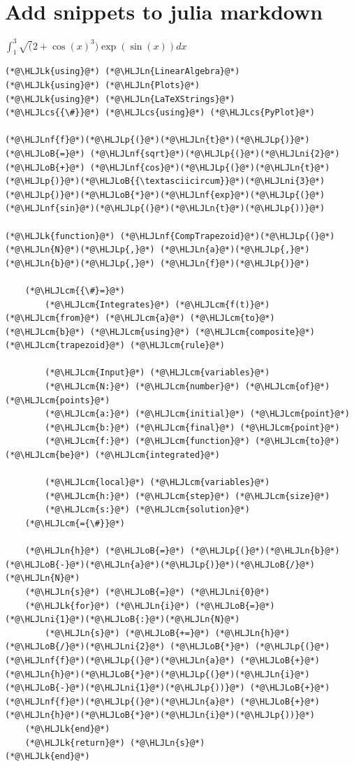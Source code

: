 \documentclass[12pt,a4paper]{article}
\newcommand{\HLJLk}[1]{\textcolor[RGB]{148,91,176}{\textbf{#1}}}
\newcommand{\HLJLn}[1]{#1}
\newcommand{\HLJLnf}[1]{\textcolor[RGB]{66,102,213}{#1}}
\newcommand{\HLJLni}[1]{\textcolor[RGB]{59,151,46}{#1}}
\newcommand{\HLJLoB}[1]{\textcolor[RGB]{102,102,102}{\textbf{#1}}}
\newcommand{\HLJLp}[1]{#1}
\newcommand{\HLJLcm}[1]{\textcolor[RGB]{153,153,119}{\textit{#1}}}
\newcommand{\HLJLcs}[1]{\textcolor[RGB]{153,153,119}{\textit{#1}}}
\begin{document}
\section{Add snippets to julia markdown}
$\int_1^3 \sqrt(2+\cos(x)^3)\exp(\sin(x))dx$


\begin{lstlisting}
(*@\HLJLk{using}@*) (*@\HLJLn{LinearAlgebra}@*)
(*@\HLJLk{using}@*) (*@\HLJLn{Plots}@*)
(*@\HLJLk{using}@*) (*@\HLJLn{LaTeXStrings}@*)
(*@\HLJLcs{{\#}}@*) (*@\HLJLcs{using}@*) (*@\HLJLcs{PyPlot}@*)

(*@\HLJLnf{f}@*)(*@\HLJLp{(}@*)(*@\HLJLn{t}@*)(*@\HLJLp{)}@*) (*@\HLJLoB{=}@*) (*@\HLJLnf{sqrt}@*)(*@\HLJLp{(}@*)(*@\HLJLni{2}@*) (*@\HLJLoB{+}@*) (*@\HLJLnf{cos}@*)(*@\HLJLp{(}@*)(*@\HLJLn{t}@*)(*@\HLJLp{)}@*)(*@\HLJLoB{{\textasciicircum}}@*)(*@\HLJLni{3}@*)(*@\HLJLp{)}@*)(*@\HLJLoB{*}@*)(*@\HLJLnf{exp}@*)(*@\HLJLp{(}@*)(*@\HLJLnf{sin}@*)(*@\HLJLp{(}@*)(*@\HLJLn{t}@*)(*@\HLJLp{))}@*)

(*@\HLJLk{function}@*) (*@\HLJLnf{CompTrapezoid}@*)(*@\HLJLp{(}@*)(*@\HLJLn{N}@*)(*@\HLJLp{,}@*) (*@\HLJLn{a}@*)(*@\HLJLp{,}@*) (*@\HLJLn{b}@*)(*@\HLJLp{,}@*) (*@\HLJLn{f}@*)(*@\HLJLp{)}@*)

    (*@\HLJLcm{{\#}=}@*)
        (*@\HLJLcm{Integrates}@*) (*@\HLJLcm{f(t)}@*) (*@\HLJLcm{from}@*) (*@\HLJLcm{a}@*) (*@\HLJLcm{to}@*) (*@\HLJLcm{b}@*) (*@\HLJLcm{using}@*) (*@\HLJLcm{composite}@*) (*@\HLJLcm{trapezoid}@*) (*@\HLJLcm{rule}@*)

        (*@\HLJLcm{Input}@*) (*@\HLJLcm{variables}@*)
        (*@\HLJLcm{N:}@*) (*@\HLJLcm{number}@*) (*@\HLJLcm{of}@*) (*@\HLJLcm{points}@*)
        (*@\HLJLcm{a:}@*) (*@\HLJLcm{initial}@*) (*@\HLJLcm{point}@*)
        (*@\HLJLcm{b:}@*) (*@\HLJLcm{final}@*) (*@\HLJLcm{point}@*)
        (*@\HLJLcm{f:}@*) (*@\HLJLcm{function}@*) (*@\HLJLcm{to}@*) (*@\HLJLcm{be}@*) (*@\HLJLcm{integrated}@*)

        (*@\HLJLcm{local}@*) (*@\HLJLcm{variables}@*)
        (*@\HLJLcm{h:}@*) (*@\HLJLcm{step}@*) (*@\HLJLcm{size}@*)
        (*@\HLJLcm{s:}@*) (*@\HLJLcm{solution}@*)
    (*@\HLJLcm{={\#}}@*)

    (*@\HLJLn{h}@*) (*@\HLJLoB{=}@*) (*@\HLJLp{(}@*)(*@\HLJLn{b}@*)(*@\HLJLoB{-}@*)(*@\HLJLn{a}@*)(*@\HLJLp{)}@*)(*@\HLJLoB{/}@*)(*@\HLJLn{N}@*)
    (*@\HLJLn{s}@*) (*@\HLJLoB{=}@*) (*@\HLJLni{0}@*)
    (*@\HLJLk{for}@*) (*@\HLJLn{i}@*) (*@\HLJLoB{=}@*) (*@\HLJLni{1}@*)(*@\HLJLoB{:}@*)(*@\HLJLn{N}@*)
        (*@\HLJLn{s}@*) (*@\HLJLoB{+=}@*) (*@\HLJLn{h}@*)(*@\HLJLoB{/}@*)(*@\HLJLni{2}@*) (*@\HLJLoB{*}@*) (*@\HLJLp{(}@*)(*@\HLJLnf{f}@*)(*@\HLJLp{(}@*)(*@\HLJLn{a}@*) (*@\HLJLoB{+}@*) (*@\HLJLn{h}@*)(*@\HLJLoB{*}@*)(*@\HLJLp{(}@*)(*@\HLJLn{i}@*)(*@\HLJLoB{-}@*)(*@\HLJLni{1}@*)(*@\HLJLp{))}@*) (*@\HLJLoB{+}@*) (*@\HLJLnf{f}@*)(*@\HLJLp{(}@*)(*@\HLJLn{a}@*) (*@\HLJLoB{+}@*) (*@\HLJLn{h}@*)(*@\HLJLoB{*}@*)(*@\HLJLn{i}@*)(*@\HLJLp{))}@*)
    (*@\HLJLk{end}@*)
    (*@\HLJLk{return}@*) (*@\HLJLn{s}@*)
(*@\HLJLk{end}@*)


\end{lstlisting}
\end{document}
